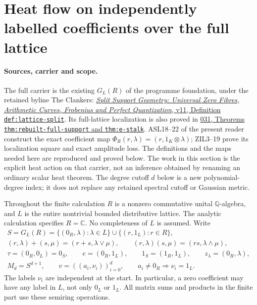 \section{Heat flow on independently labelled coefficients over the full lattice}
\label{sec:full-lattice-heat-operator}

\paragraph{Sources, carrier and scope.}
The full carrier is the existing $G_L(R)$ of the programme foundation,
under the retained byline The Clankers:
\href{https://github.com/KokunoYumeto/zeta-function-research-reader/blob/a2851f9eb352e7e4376bc629de86fa4ed9c1c434/workbenches/splitzero-tandem/foundations/split-support-geometry-v11/split_support_geometry_arithmetic_curve_v11.tex}{\emph{Split
Support Geometry: Universal Zero Fibres, Arithmetic Curves, Frobenius
and Perfect Quantization}, v11, Definition \texttt{def:lattice-split}}.
Its full-lattice localization is also proved in
\href{https://github.com/KokunoYumeto/zeta-function-research-reader/blob/3c78cfbd9e194d35117b33277c421c6564ce3dbf/workbenches/splitzero-tandem/continuations/20260923-full-prime-support/031/01_REBUILT_MATHEMATICS.tex}{031,
Theorems \texttt{thm:rebuilt-full-support} and \texttt{thm:e-stalk}}.
ASL18--22 of the present reader construct the exact coefficient map
$\Phi_R(r,\lambda)=(r,1_K\otimes\lambda)$; ZIL3--19 prove its
localization square and exact amplitude loss. The definitions and
the maps needed here are reproduced and proved below. The work in
this section is the explicit heat action on that carrier, not an
inference obtained by renaming an ordinary scalar heat theorem.
The degree cutoff $d$ below is a new polynomial-degree index; it
does not replace any retained spectral cutoff or Gaussian metric.

Throughout the finite calculation $R$ is a nonzero commutative
unital $\mathbb Q$-algebra, and $L$ is the entire nontrivial bounded
distributive lattice. The analytic calculation specifies $R=\mathbb C$.
No completeness of $L$ is assumed. Write
\begin{equation}\tag{HSL1}
\begin{gathered}
 S=G_L(R)=\{(0_R,\lambda):\lambda\in L\}
              \cup\{(r,1_L):r\in R\},\\
 (r,\lambda)+(s,\mu)=(r+s,\lambda\vee\mu),\qquad
 (r,\lambda)(s,\mu)=(rs,\lambda\wedge\mu),\\
 \tau=(0_R,0_L)=0_S,\qquad e=(0_R,1_L),\qquad
 1_S=(1_R,1_L),\qquad z_\lambda=(0_R,\lambda),\\
 M_d=S^{d+1},\qquad
 v=((a_i,\nu_i))_{i=0}^{d},\qquad
 a_i\ne0_R\Longrightarrow\nu_i=1_L.
\end{gathered}
\end{equation}
The labels $\nu_i$ are independent at the start. In particular,
a zero coefficient may have any label in $L$, not only $0_L$
or $1_L$. All matrix sums and products in the finite part use
these semiring operations.

